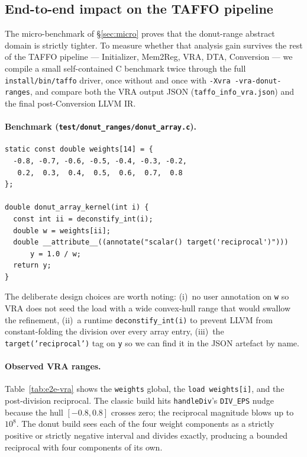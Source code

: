 \documentclass[11pt,a4paper]{article}
\theoremstyle{plain}
\begin{document}
\subsection{End-to-end impact on the TAFFO pipeline}
\label{sec:eval-e2e}
\label{sec:e2e}

The micro-benchmark of \S\ref{sec:micro} proves that the donut-range
abstract domain is strictly tighter. To measure whether that analysis
gain survives the rest of the TAFFO pipeline --- Initializer, Mem2Reg,
VRA, DTA, Conversion --- we compile a small self-contained C benchmark
twice through the full \texttt{install/bin/taffo} driver, once without
and once with \texttt{-Xvra -vra-donut-ranges}, and compare both the
VRA output JSON (\texttt{taffo\_info\_vra.json}) and the final
post-Conversion LLVM IR.

\paragraph{Benchmark (\texttt{test/donut\_ranges/donut\_array.c}).}

\begin{lstlisting}[caption={End-to-end donut-range benchmark (excerpt).},label={lst:bench},basicstyle=\ttfamily\scriptsize]
static const double weights[14] = {
  -0.8, -0.7, -0.6, -0.5, -0.4, -0.3, -0.2,
   0.2,  0.3,  0.4,  0.5,  0.6,  0.7,  0.8
};

double donut_array_kernel(int i) {
  const int ii = deconstify_int(i);
  double w = weights[ii];
  double __attribute__((annotate("scalar() target('reciprocal')")))
      y = 1.0 / w;
  return y;
}
\end{lstlisting}

The deliberate design choices are worth noting: (i)~no user annotation
on \texttt{w} so VRA does not seed the load with a wide convex-hull
range that would swallow the refinement, (ii)~a runtime
\texttt{deconstify\_int(i)} to prevent LLVM from constant-folding the
division over every array entry, (iii)~the \texttt{target('reciprocal')}
tag on \texttt{y} so we can find it in the JSON artefact by name.

\paragraph{Observed VRA ranges.} Table~\ref{tab:e2e-vra} shows the
\texttt{weights} global, the \texttt{load weights[i]}, and the
post-division reciprocal. The classic build hits \texttt{handleDiv}'s
\texttt{DIV\_EPS} nudge because the hull $[-0.8,0.8]$ crosses zero; the
reciprocal magnitude blows up to $10^8$. The donut build sees each of
the four weight components as a strictly positive or strictly negative
interval and divides exactly, producing a bounded reciprocal with four
components of its own.
\end{document}
